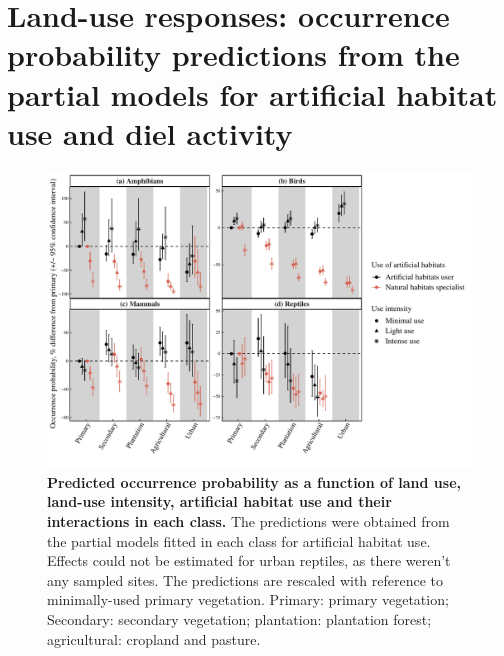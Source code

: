 \documentclass[11pt]{article}
\begin{document}
\clearpage
\section{Land-use responses: occurrence probability predictions from the partial models for artificial habitat use and diel activity}

\begin{figure}[h!]
\centering
\includegraphics[scale=0.7]{Figures/Partial_models_predictions/Specialisation}
\caption[]{\textbf{Predicted occurrence probability as a function of land use, land-use intensity, artificial habitat use and their interactions in each class.} The predictions were obtained from the partial models fitted in each class for artificial habitat use. Effects could not be estimated for urban reptiles, as there weren't any sampled sites. The predictions are rescaled with reference to minimally-used primary vegetation. Primary: primary vegetation; Secondary: secondary vegetation; plantation: plantation forest; agricultural: cropland and pasture.}
\label{}
\end{figure}
\end{document}

